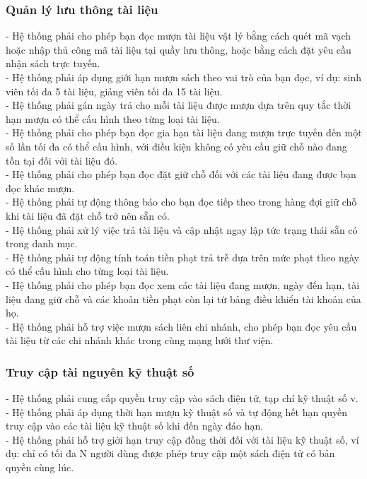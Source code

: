 \subsubsection{Quản lý lưu thông tài liệu}
- Hệ thống phải cho phép bạn đọc mượn tài liệu vật lý bằng cách quét mã vạch hoặc nhập thủ công mã tài liệu tại quầy lưu thông, hoặc bằng cách đặt yêu cầu nhận sách trực tuyến.\\
- Hệ thống phải áp dụng giới hạn mượn sách theo vai trò của bạn đọc, ví dụ: sinh viên tối đa 5 tài liệu, giảng viên tối đa 15 tài liệu.\\
- Hệ thống phải gán ngày trả cho mỗi tài liệu được mượn dựa trên quy tắc thời hạn mượn có thể cấu hình theo từng loại tài liệu.\\
- Hệ thống phải cho phép bạn đọc gia hạn tài liệu đang mượn trực tuyến đến một số lần tối đa có thể cấu hình, với điều kiện không có yêu cầu giữ chỗ nào đang tồn tại đối với tài liệu đó.\\
- Hệ thống phải cho phép bạn đọc đặt giữ chỗ đối với các tài liệu đang được bạn đọc khác mượn.\\
- Hệ thống phải tự động thông báo cho bạn đọc tiếp theo trong hàng đợi giữ chỗ khi tài liệu đã đặt chỗ trở nên sẵn có.\\
- Hệ thống phải xử lý việc trả tài liệu và cập nhật ngay lập tức trạng thái sẵn có trong danh mục.\\
- Hệ thống phải tự động tính toán tiền phạt trả trễ dựa trên mức phạt theo ngày có thể cấu hình cho từng loại tài liệu.\\
- Hệ thống phải cho phép bạn đọc xem các tài liệu đang mượn, ngày đến hạn, tài liệu đang giữ chỗ và các khoản tiền phạt còn lại từ bảng điều khiển tài khoản của họ.\\
- Hệ thống phải hỗ trợ việc mượn sách liên chi nhánh, cho phép bạn đọc yêu cầu tài liệu từ các chi nhánh khác trong cùng mạng lưới thư viện.\\

\subsubsection{Truy cập tài nguyên kỹ thuật số}
- Hệ thống phải cung cấp quyền truy cập vào sách điện tử, tạp chí kỹ thuật số v.\\
- Hệ thống phải áp dụng thời hạn mượn kỹ thuật số và tự động hết hạn quyền truy cập vào các tài liệu kỹ thuật số khi đến ngày đáo hạn.\\
- Hệ thống phải hỗ trợ giới hạn truy cập đồng thời đối với tài liệu kỹ thuật số, ví dụ: chỉ có tối đa N người dùng được phép truy cập một sách điện tử có bản quyền cùng lúc.\\

